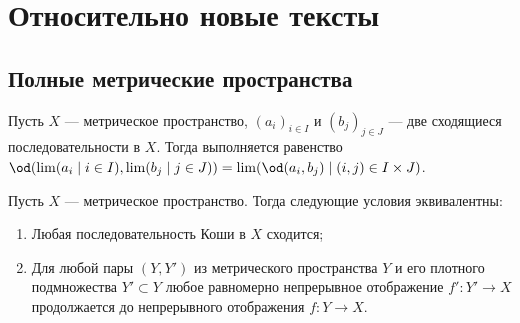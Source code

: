 \documentclass[
	extrafontsizes,
	11pt,
	hyphens,
]{memoir}
\begin{document}
%
%
%
%



\chapter{Относительно новые тексты}


\section{Полные метрические пространства}

\begin{observation} \label{obs:SeqLimDist}
Пусть \(X\) --- метрическое пространство, \((a_i)_{i \in I}\) и \((b_j)_{j \in J}\) --- две сходящиеся последовательности в \(X\). Тогда выполняется равенство
\(\od(\lim (a_i \mid i \in I), \lim (b_j \mid j \in J)) = \lim (\od(a_i, b_j) \mid (i,j) \in I \times J)\).
\end{observation}

\begin{theorem}
Пусть \(X\) --- метрическое пространство.%
\label{thm:ComplMetrSpace}
Тогда следующие условия эквивалентны:
\begin{enumerate}[
	font=\upshape,
	label=\asbuk*),
	ref=\asbuk*,
	]
	
\item \label{itm:ComplMetrSpaceOne} Любая последовательность Коши в \(X\) сходится;

\item \label{itm:ComplMetrSpaceTwo} Для любой пары \((Y,Y')\) из метрического пространства \(Y\) и его плотного подмножества \(Y' \subset Y\) любое равномерно непрерывное отображение \(f' : Y' \to X\) продолжается до непрерывного отображения \(f : Y \to X\).

\end{enumerate}
\end{theorem}
\end{document}
